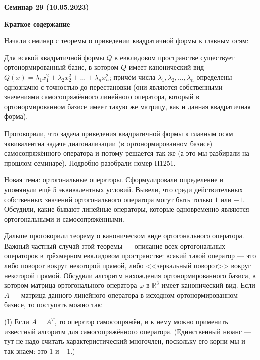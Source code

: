 \documentclass[10pt, a4paper]{extarticle}
\def \R{\mathbb{R}}
\theoremstyle{definition}
\begin{document}
\begin{center}
\small
\noindent{}
\end{center}

\large

\begin{center}
\textbf{Семинар 29 (10.05.2023)}
\end{center}

\textbf{Краткое содержание}

Начали семинар с теоремы о приведении квадратичной формы к главным осям:

Для всякой квадратичной формы $Q$ в евклидовом пространстве существует ортонормированный базис, в котором $Q$ имеет канонический вид
 $Q(x) = \lambda_1x_1^2 + \lambda_2x_2^2 + \ldots + \lambda_n x_n^2$; причём числа $\lambda_1, \lambda_2, \ldots, \lambda_n$ определены 
 однозначно с точностью до перестановки (они являются собственными значениями самосопряжённого линейного оператора, который в ортонормированном 
 базисе имеет такую же матрицу, как и данная квадратичная форма).

Проговорили, что задача приведения квадратичной формы к главным осям эквивалентна задаче диагонализации (в ортонормированном базисе) самосопряжённого оператора и потому решается так же (а это мы разбирали на прошлом семинаре).
Подробно разобрали номер П1251.

Новая тема: ортогональные операторы.
Сформулировали определение и упомянули ещё 5 эквивалентных условий. Вывели, что среди действительных собственных значений ортогонального оператора могут быть только $1$ или $-1$.
Обсудили, какие бывают линейные операторы, которые одновременно являются ортогональными и самосопряжёнными.

Дальше проговорили теорему о каноническом виде ортогонального оператора.
Важный частный случай этой теоремы --- описание всех ортогональных операторов в трёхмерном евклидовом пространстве: всякий такой оператор --- это либо поворот вокруг некоторой прямой, либо  <<зеркальный поворот>> вокруг некоторой прямой.
Обсудили алгоритм нахождения ортонормированного базиса, в котором матрица ортогонального оператора $\varphi$ в $\R^3$ имеет канонический вид.
Если $A$ --- матрица данного линейного оператора в исходном ортонормированном базисе, то поступать можно так:

(I) Если $A = A^T$, то оператор самосопряжён, и к нему можно применить известный алгоритм для самосопряжённого оператора. (Единственный нюанс --- тут не надо считать характеристический многочлен, поскольку его корни мы и так знаем: это $1$ и $-1$.)
\end{document}
